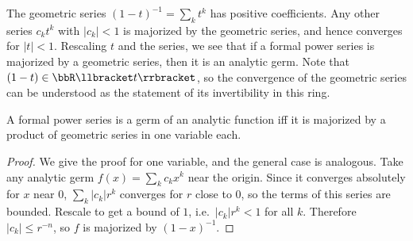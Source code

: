 \begin{example}
    The geometric series $(1-t)^{-1}=\sum_k t^k$ has positive coefficients. Any other series $c_k t^k$ with $|c_k|<1$ is majorized by the geometric series, and hence converges for $|t|<1$.  Rescaling $t$ and the series, we see that if a formal power series is majorized by a geometric series, then it is an analytic germ. Note that $(1-t)\in\bbR\llbracket t\rrbracket$, so the convergence of the geometric series can be understood as the statement of its invertibility in this ring.
\end{example}

\begin{lem}\label{lem 121}
    A formal power series is a germ of an analytic function iff it is majorized by a product of geometric series in one variable each.
\end{lem}
\begin{proof}
    We give the proof for one variable, and the general case is analogous. Take any analytic germ $f(x)=\sum_k c_k x^k$ near the origin. Since it converges absolutely for $x$ near $0$, $\sum_k |c_k| r^k$ converges for $r$ close to $0$, so the terms of this series are bounded. Rescale to get a bound of $1$, i.e.\ $|c_k|r^k<1$ for all $k$. 
    Therefore $|c_k|\leq r^{-n}$, so $f$ is majorized by $(1-x)^{-1}$.
\end{proof}

